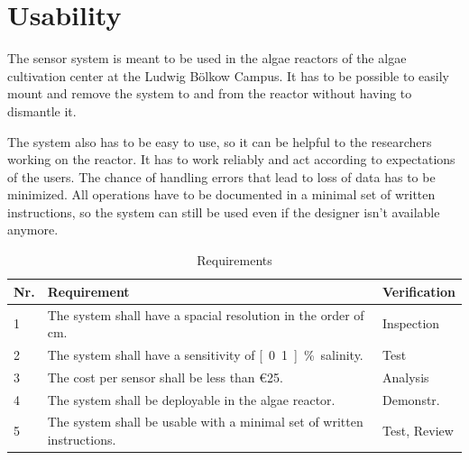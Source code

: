 \section{Usability}

The sensor system is meant to be used in the algae reactors of the algae cultivation center at the Ludwig Bölkow Campus. It has to be possible to easily mount and remove the system to and from the reactor without having to dismantle it.

The system also has to be easy to use, so it can be helpful to the researchers working on the reactor. It has to work reliably and act according to expectations of the users. The chance of handling errors that lead to loss of data has to be minimized. All operations have to be documented in a minimal set of written instructions, so the system can still be used even if the designer isn't available anymore.

\begin{table}[H]
    \centering

    \caption[Requirements]{Requirements}
    \label{tab:req}
    \begin{tabular}{lp{}l}
        	\toprule
        	Nr. & Requirement & Verification \tabularnewline
        	\midrule
		1 & The system shall have a spacial resolution in the order of \unit[1]{cm}. & Inspection \tabularnewline
		2 & The system shall have a sensitivity of  \unit[0.1]{\%} salinity.  & Test \tabularnewline
		3 & The cost per sensor shall be less than \euro{25}.  & Analysis \tabularnewline
		4 & The system shall be deployable in the algae reactor. & Demonstr. \tabularnewline
		5 & The system shall be usable with a minimal set of written instructions. & Test, Review \tabularnewline
        \bottomrule
    \end{tabular}
\end{table}